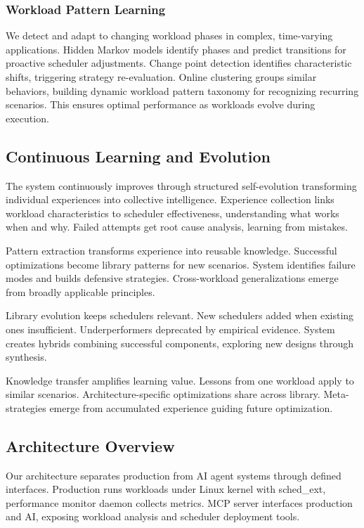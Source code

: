 \subsubsection{Workload Pattern Learning}
We detect and adapt to changing workload phases in complex, time-varying applications. Hidden Markov models identify phases and predict transitions for proactive scheduler adjustments. Change point detection identifies characteristic shifts, triggering strategy re-evaluation. Online clustering groups similar behaviors, building dynamic workload pattern taxonomy for recognizing recurring scenarios. This ensures optimal performance as workloads evolve during execution.

\subsection{Continuous Learning and Evolution}

The system continuously improves through structured self-evolution transforming individual experiences into collective intelligence. Experience collection links workload characteristics to scheduler effectiveness, understanding what works when and why. Failed attempts get root cause analysis, learning from mistakes.

Pattern extraction transforms experience into reusable knowledge. Successful optimizations become library patterns for new scenarios. System identifies failure modes and builds defensive strategies. Cross-workload generalizations emerge from broadly applicable principles.

Library evolution keeps schedulers relevant. New schedulers added when existing ones insufficient. Underperformers deprecated by empirical evidence. System creates hybrids combining successful components, exploring new designs through synthesis.

Knowledge transfer amplifies learning value. Lessons from one workload apply to similar scenarios. Architecture-specific optimizations share across library. Meta-strategies emerge from accumulated experience guiding future optimization.

\subsection{Architecture Overview}

Our architecture separates production from AI agent systems through defined interfaces. Production runs workloads under Linux kernel with sched\_ext, performance monitor daemon collects metrics. MCP server interfaces production and AI, exposing workload analysis and scheduler deployment tools.

